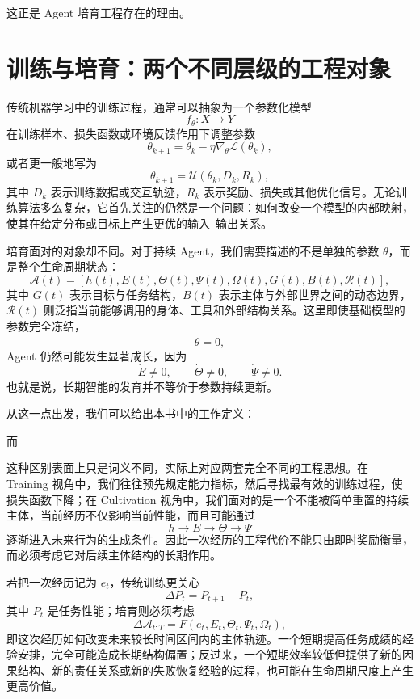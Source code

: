 这正是 Agent 培育工程存在的理由。

\section{训练与培育：两个不同层级的工程对象}

传统机器学习中的训练过程，通常可以抽象为一个参数化模型
\[
f_{\theta}:X\rightarrow Y
\]
在训练样本、损失函数或环境反馈作用下调整参数
\[
\theta_{k+1}
=
\theta_k-\eta\nabla_{\theta}\mathcal{L}(\theta_k),
\]
或者更一般地写为
\[
\theta_{k+1}
=
\mathcal{U}
\left(
\theta_k,
D_k,
R_k
\right),
\]
其中 $D_k$ 表示训练数据或交互轨迹，$R_k$ 表示奖励、损失或其他优化信号。无论训练算法多么复杂，它首先关注的仍然是一个问题：如何改变一个模型的内部映射，使其在给定分布或目标上产生更优的输入--输出关系。

培育面对的对象却不同。对于持续 Agent，我们需要描述的不是单独的参数 $\theta$，而是整个生命周期状态：
\[
\mathcal{A}(t)
=
\left[
h(t),
E(t),
\Theta(t),
\Psi(t),
\Omega(t),
G(t),
B(t),
\mathcal{R}(t)
\right],
\]
其中 $G(t)$ 表示目标与任务结构，$B(t)$ 表示主体与外部世界之间的动态边界，$\mathcal{R}(t)$ 则泛指当前能够调用的身体、工具和外部结构关系。这里即使基础模型的参数完全冻结，
\[
\dot{\theta}=0,
\]
Agent 仍然可能发生显著成长，因为
\[
\dot{E}\neq 0,\qquad
\dot{\Theta}\neq 0,\qquad
\dot{\Psi}\neq 0.
\]
也就是说，长期智能的发育并不等价于参数持续更新。

从这一点出发，我们可以给出本书中的工作定义：
\begin{statementbox}
\centering
{}
\end{statementbox}
而
\begin{statementbox}
\centering
{}
\end{statementbox}

这种区别表面上只是词义不同，实际上对应两套完全不同的工程思想。在 Training 视角中，我们往往预先规定能力指标，然后寻找最有效的训练过程，使损失函数下降；在 Cultivation 视角中，我们面对的是一个不能被简单重置的持续主体，当前经历不仅影响当前性能，而且可能通过
\[
h
\rightarrow
E
\rightarrow
\Theta
\rightarrow
\Psi
\]
逐渐进入未来行为的生成条件。因此一次经历的工程代价不能只由即时奖励衡量，而必须考虑它对后续主体结构的长期作用。

若把一次经历记为 $e_t$，传统训练更关心
\[
\Delta P_t
=
P_{t+1}-P_t,
\]
其中 $P_t$ 是任务性能；培育则必须考虑
\[
\Delta \mathcal{A}_{t:T}
=
F
\left(
e_t,
E_t,
\Theta_t,
\Psi_t,
\Omega_t
\right),
\]
即这次经历如何改变未来较长时间区间内的主体轨迹。一个短期提高任务成绩的经验安排，完全可能造成长期结构偏置；反过来，一个短期效率较低但提供了新的因果结构、新的责任关系或新的失败恢复经验的过程，也可能在生命周期尺度上产生更高价值。

